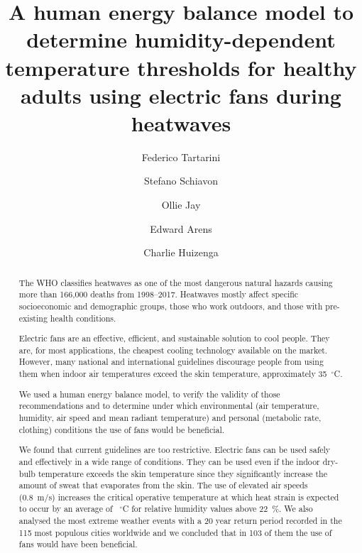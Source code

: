 
\begin{frontmatter}

\title{A human energy balance model to determine humidity-dependent temperature thresholds for healthy adults using electric fans during heatwaves}


\author[sinBerBest]{Federico Tartarini}
\author[CBE]{Stefano Schiavon}
\author[USYD]{Ollie Jay}
\author[CBE]{Edward Arens}
\author[CBE]{Charlie Huizenga}

\address[sinBerBest]{SinBerBEST, Berkeley Education Alliance for Research in Singapore, Singapore}
\address[CBE]{Center for the Built Environment, University of California, Berkeley, USA}
 \address[USYD]{Sydney School of Health Sciences, Faculty of Medicine and Health, The University of Sydney, Sydney, Australia}

\begin{abstract}
    The WHO classifies heatwaves as one of the most dangerous natural hazards causing more than 166,000 deaths from 1998--2017.
    Heatwaves mostly affect specific socioeconomic and demographic groups, those who work outdoors, and those with pre-existing health conditions.
    
    Electric fans are an effective, efficient, and sustainable solution to cool people.
    They are, for most applications, the cheapest cooling technology available on the market.
    However, many national and international guidelines discourage people from using them when indoor air temperatures exceed the skin temperature, approximately 35~$^{\circ}$C\@.
    
    We used a human energy balance model, to verify the validity of those recommendations and to determine under which environmental (air temperature, humidity, air speed and mean radiant temperature) and personal (metabolic rate, clothing) conditions the use of fans would be beneficial.
    
    We found that current guidelines are too restrictive.
    Electric fans can be used safely and effectively in a wide range of conditions.
    They can be used even if the indoor dry-bulb temperature exceeds the skin temperature since they significantly increase the amount of sweat that evaporates from the skin.
    The use of elevated air speeds (0.8~m/s) increases the critical operative temperature at which heat strain is expected to occur by an average of ~$^{\circ}$C for relative humidity values above 22~\%\@.
    We also analysed the most extreme weather events with a 20 year return period recorded in the 115 most populous cities worldwide and we concluded that in 103 of them the use of fans would have been beneficial.
    

\end{abstract}
\end{frontmatter}
